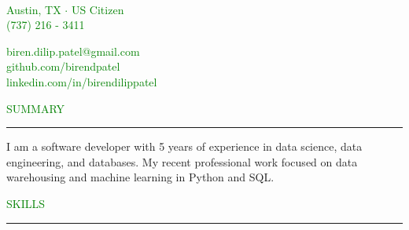\documentclass [
        11pt
] {article}
\begin{document}
\begin{multicols}{2}

\\
\noindent \textcolor{green}{Austin, TX $ \boldsymbol{\cdot} $ US Citizen}\\
	\noindent \textcolor{green}{(737) 216 - 3411}\\

\columnbreak

\hspace*{\fill} \noindent \textcolor{green}{biren.dilip.patel@gmail.com}\\
\hspace*{\fill} \noindent \textcolor{green}{github.com/birendpatel}\\
\hspace*{\fill} \noindent \textcolor{green}{linkedin.com/in/birendilippatel}

\end{multicols}


\noindent\textcolor{green}{SUMMARY \rule{16.35cm}{1pt}}

\vspace*{10pt}

\noindent I am a software developer with 5 years of experience in data science, 
data engineering, and databases. My recent professional work focused on data
warehousing and machine learning in Python and SQL.

\vspace*{10pt}



\noindent\textcolor{green}{SKILLS \rule{17cm}{1pt}}
\end{document}
